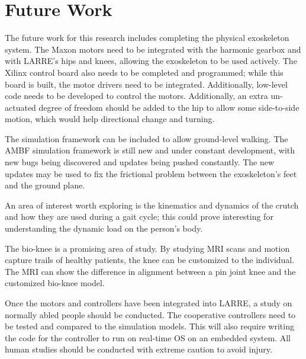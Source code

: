 \chapter{Future Work}

The future work for this research includes completing the physical exoskeleton system. The Maxon motors need to be integrated with the harmonic gearbox and with LARRE's hips and knees, allowing the exoskeleton to be used actively. The Xilinx control board also needs to be completed and programmed; while this board is built, the motor drivers need to be integrated. Additionally, low-level code needs to be developed to control the motors. Additionally, an extra un-actuated degree of freedom should be added to the hip to allow some side-to-side motion, which would help directional change and turning. 

The simulation framework can be included to allow ground-level walking. The AMBF simulation framework is still new and under constant development, with new bugs being discovered and updates being pushed constantly. The new updates may be used to fix the frictional problem between the exoskeleton's feet and the ground plane.

An area of interest worth exploring is the kinematics and dynamics of the crutch and how they are used during a gait cycle; this could prove interesting for understanding the dynamic load on the person's body. 

The bio-knee is a promising area of study. By studying MRI scans and motion capture trails of healthy patients, the knee can be customized to the individual. The MRI can show the difference in alignment between a pin joint knee and the customized bio-knee model. 

Once the motors and controllers have been integrated into LARRE, a study on normally abled people should be conducted. The cooperative controllers need to be tested and compared to the simulation models. This will also require writing the code for the controller to run on real-time OS on an embedded system. All human studies should be conducted with extreme caution to avoid injury. 
